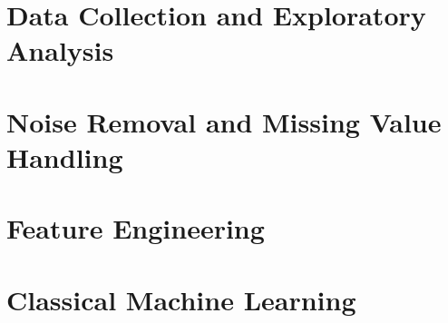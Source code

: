 \documentclass[runningheads]{llncs}
\begin{document}
\section{Data Collection and Exploratory Analysis}\label{sec:eda}



\section{Noise Removal and Missing Value Handling}\label{sec:noise}



\section{Feature Engineering}\label{sec:features}



\section{Classical Machine Learning}\label{sec:classical}

\end{document}
